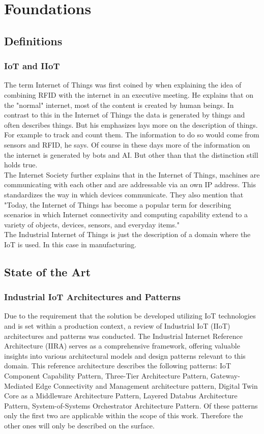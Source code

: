 \clearpage
\chapter{\textbf{Foundations}}\label{grundlagen}
\section{Definitions}
\subsection{IoT and IIoT}
The term Internet of Things was first coined by \cite{ashtonThatInternetThings} when explaining the idea of combining RFID with the internet in an executive meeting. He explains that on the "normal" internet, most of the content is created by human beings. In contrast to this in the Internet of Things the data is generated by things and often describes things. But his emphasizes lays more on the description of things. For example to track and count them. The information to do so would come from sensors and RFID, he says.
Of course in these days more of the information on the internet is generated by bots and AI. But other than that the distinction still holds true. 
\\The Internet Society \cite{roseInternetThingsOverview} further explains that in the Internet of Things, machines are communicating with each other and are addressable via an own IP address. This standardizes the way in which devices communicate. They also mention that "Today, the Internet of Things has become a popular term for describing scenarios in which  Internet connectivity and computing capability extend to a variety of objects, devices, sensors, and everyday  items."
\\The Industrial Internet of Things is just the description of a domain where the IoT is used. In this case in manufacturing. \cite{WhatIoTInternet}
\section{State of the Art}\label{unterkapitel}
\subsection{Industrial IoT Architectures and Patterns}
Due to the requirement that the solution be developed utilizing IoT technologies and is set within a production context, a review of Industrial IoT (IIoT) architectures and patterns was conducted. The Industrial Internet Reference Architecture (IIRA) \cite{IIRA} serves as a comprehensive framework, offering valuable insights into various architectural models and design patterns relevant to this domain. This reference architecture describes the following patterns: IoT Component Capability Pattern, Three-Tier Architecture Pattern, Gateway-Mediated Edge Connectivity and Management architecture pattern, Digital Twin Core as a Middleware Architecture Pattern, Layered Databus Architecture Pattern, System-of-Systems Orchestrator Architecture Pattern. Of these patterns only the first two are applicable within the scope of this work. Therefore the other ones will only be described on the surface.
